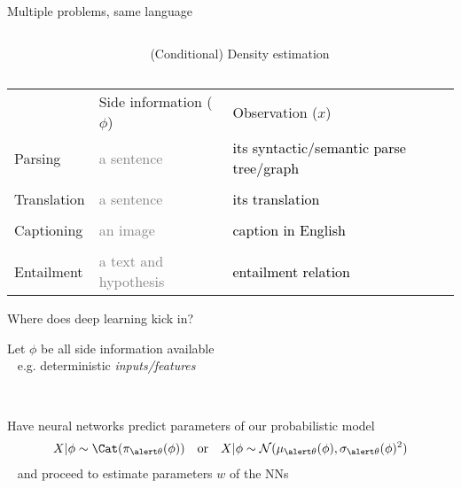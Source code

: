 \documentclass[14pt]{beamer}
\begin{document}
\begin{frame}{Multiple problems, same language}



\begin{small}

\begin{columns}
\begin{column}{0.3\textwidth}
\end{column}
\begin{column}{0.6\textwidth}
\alert{(Conditional) Density estimation}
\end{column}

\end{columns}

\begin{tabular}{p{2cm} p{4cm} p{4cm}}
 & Side information ($\phi$) & Observation ($x$) \\
Parsing &   \textcolor{gray}{a sentence} & \textcolor{black}{its syntactic/semantic parse tree/graph} \\
&&\\
Translation &  \textcolor{gray}{a sentence} & \textcolor{black}{its translation} \\
&&\\
Captioning &  \textcolor{gray}{an image} & \textcolor{black}{caption in English} \\
&&\\
Entailment  & \textcolor{gray}{a text and hypothesis} & \textcolor{black}{entailment relation}
\end{tabular}
\end{small}

\end{frame}

\begin{frame}{Where does deep learning kick in?}

Let $\phi$ be all side information available\\
~ e.g. deterministic \emph{inputs/features}

~

Have neural networks predict parameters of our probabilistic model
	\begin{align*}
    X|\phi \sim \Cat(\pi_{\alert \theta}(\phi)) & & \text{or} & & X|\phi \sim \mathcal N(\mu_{\alert \theta}(\phi), \sigma_{\alert \theta}(\phi)^2)
    \end{align*}
~ and proceed to \alert{estimate parameters} $w$ of the NNs %

 





\end{frame}
\end{document}
